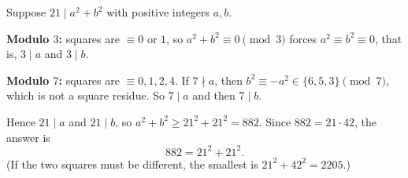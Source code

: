 Suppose $21\mid a^2+b^2$ with positive integers $a,b$.

\textbf{Modulo $3$:} squares are $\equiv0$ or $1$, so $a^2+b^2\equiv0\pmod3$ forces $a^2\equiv b^2\equiv0$, that is, $3\mid a$ and $3\mid b$.

\textbf{Modulo $7$:} squares are $\equiv0,1,2,4$. If $7\nmid a$, then $b^2\equiv-a^2\in\{6,5,3\}\pmod 7$, which is not a square residue. So $7\mid a$ and then $7\mid b$.

Hence $21\mid a$ and $21\mid b$, so $a^2+b^2\ge21^2+21^2=882$. Since $882=21\cdot42$, the answer is
\[
\boxed{882=21^2+21^2}.
\]
(If the two squares must be different, the smallest is $21^2+42^2=2205$.)
